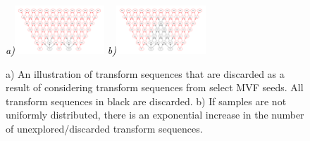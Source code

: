 \begin{figure}[ht]
\centering
  {\footnotesize\textit{\textcolor{black}{a)}}}\includegraphics[width=0.3\textwidth]{figs/spacing_small.pdf} 
  {\footnotesize\textit{\textcolor{black}{b)}}}\includegraphics[width=0.3\textwidth]{figs/spacing_large.pdf} 
\caption{a) An illustration of transform sequences that are discarded as a result of considering transform sequences from select MVF seeds. All transform sequences in black are discarded. b) If samples are not uniformly distributed, there is an exponential increase in the number of unexplored/discarded transform sequences. }
\label{fig:trans_missed} 
\end{figure}










